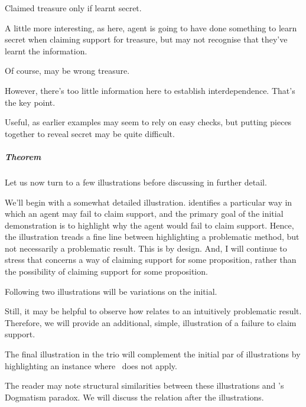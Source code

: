 \begin{note}
  \begin{illustration}
    Claimed treasure only if learnt secret.
  \end{illustration}
  A little more interesting, as here, agent is going to have done something to learn secret when claiming support for treasure, but may not recognise that they've learnt the information.

  Of course, may be wrong treasure.

  However, there's too little information here to establish interdependence.
  That's the key point.

  Useful, as earlier examples may seem to rely on easy checks, but putting pieces together to reveal secret may be quite difficult.
\end{note}

\subparagraph{Theorem }

\begin{note}
  Let us now turn to a few illustrations before discussing \nI{} in further detail.

  We'll begin with a somewhat detailed illustration.
  \nI{} identifies a particular way in which an agent may fail to claim support, and the primary goal of the initial demonstration is to highlight why the agent would fail to claim support.
  Hence, the illustration treads a fine line between highlighting a problematic method, but not necessarily a problematic result.
  This is by design.
  And, I will continue to stress that \nI{} concerns a way of claiming support for some proposition, rather than the possibility of claiming support for some proposition.

  Following two illustrations will be variations on the initial.

  Still, it may be helpful to observe how \nI{} relates to an intuitively problematic result.
  Therefore, we will provide an additional, simple, illustration of a failure to claim support.

  The final illustration in the trio will complement the initial par of illustrations by highlighting an instance where~\nI{} does not apply.

  The reader may note structural similarities between these illustrations and \citeauthor{Kripke:2011wv}'s Dogmatism paradox.
  We will discuss the relation after the illustrations.
\end{note}

